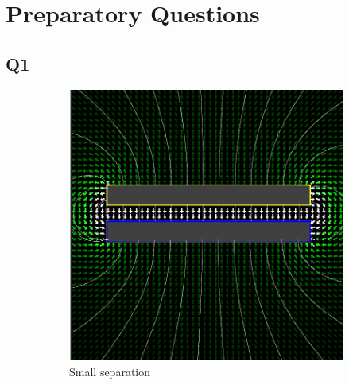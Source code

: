 \section{Preparatory Questions}

\subsection{Q1}

\begin{figure}[H]
  \begin{subfigure}{0.5\textwidth}
    \includegraphics[width=\linewidth]{capacitors/img/small_sep.png}
    \caption{Small separation} \label{prep_answers:fig:q1:small_sep}
  \end{subfigure}
  \hspace*{\fill}
  \begin{subfigure}{0.5\textwidth}

\end{subfigure}
\end{figure}
